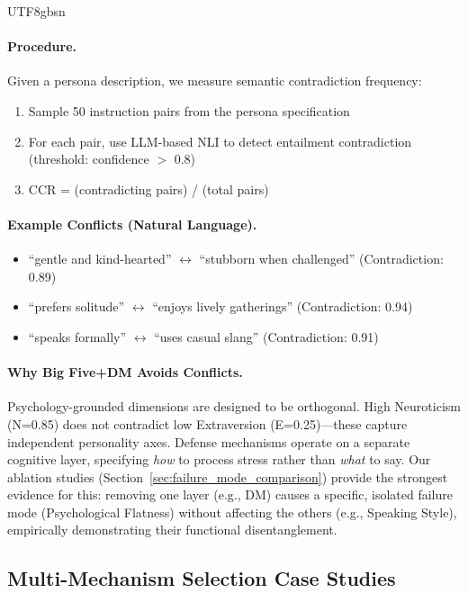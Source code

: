 \documentclass[11pt]{article}
\begin{document}
\begin{CJK*}{UTF8}{gbsn}
\paragraph{Procedure.} Given a persona description, we measure semantic contradiction frequency:
\begin{enumerate}
    \item Sample 50 instruction pairs from the persona specification
    \item For each pair, use LLM-based NLI to detect entailment contradiction (threshold: confidence $>$ 0.8)
    \item CCR = (contradicting pairs) / (total pairs)
\end{enumerate}

\paragraph{Example Conflicts (Natural Language).}
\begin{itemize}
    \item ``gentle and kind-hearted'' $\leftrightarrow$ ``stubborn when challenged'' (Contradiction: 0.89)
    \item ``prefers solitude'' $\leftrightarrow$ ``enjoys lively gatherings'' (Contradiction: 0.94)
    \item ``speaks formally'' $\leftrightarrow$ ``uses casual slang'' (Contradiction: 0.91)
\end{itemize}

\paragraph{Why Big Five+DM Avoids Conflicts.} Psychology-grounded dimensions are designed to be orthogonal. High Neuroticism (N=0.85) does not contradict low Extraversion (E=0.25)---these capture independent personality axes. Defense mechanisms operate on a separate cognitive layer, specifying \textit{how} to process stress rather than \textit{what} to say. Our ablation studies (Section~\ref{sec:failure_mode_comparison}) provide the strongest evidence for this: removing one layer (e.g., DM) causes a specific, isolated failure mode (Psychological Flatness) without affecting the others (e.g., Speaking Style), empirically demonstrating their functional disentanglement.

\subsection{Multi-Mechanism Selection Case Studies}
\label{sec:multi_dm_cases}


\end{CJK*}
\end{document}
